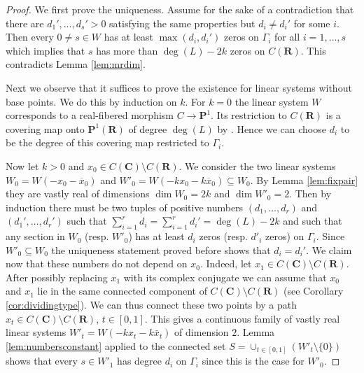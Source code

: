 \documentclass[12pt]{amsart}
\newcounter{conj}
\numberwithin{equation}{section}
\numberwithin{thmcounter}{section}
\theoremstyle{definition}
\theoremstyle{claim}
\newcommand{\nR}{\mathbf{R}}
\newcommand{\nC}{\mathbf{C}}
\newcommand{\nP}{\mathbf{P}}
\begin{document}
\begin{proof}
 We first prove the uniqueness. Assume for the sake of a contradiction that there are $d_1',\ldots,d_s'>0$ satisfying the same properties but $d_i\neq d_i'$ for some $i$. Then every $0\neq s\in W$ has at least $\max(d_i,d_i')$ zeros on $\Gamma_i$ for all $i=1,\ldots,s$ which implies that $s$ has more than $\deg(L)-2k$ zeros on $C(\nR)$. This contradicts Lemma \ref{lem:mrdim}.

\medskip

\noindent  Next we observe that it suffices to prove the existence for linear systems without base points. We do this by induction on $k$.
 For $k=0$ the linear system $W$ corresponds to a real-fibered morphism $C\to\nP^1$. Its restriction to $C(\nR)$ is a covering map onto $\nP^1(\nR)$ of degree $\deg(L)$ by \cite[Theorem 2.19]{kummershamovich}. Hence we can choose $d_i$ to be the degree of this covering map restricted to $\Gamma_i$.

\medskip

\noindent  Now let $k>0$ and $x_0\in C(\nC)\setminus C(\nR)$. We consider the two linear systems $W_0=W(-x_0-\overline{x}_0)$ and $W'_0=W(-kx_0-k\overline{x}_0)\subseteq W_0$.  
 By Lemma \ref{lem:fixpair} they are vastly real of dimensions $\dim W_0=2k$ and $\dim W'_0=2$. Then by induction there must be two tuples of positive numbers $(d_1,\ldots,d_r)$ and $(d_1',\ldots,d_r')$ such that $\sum_{i=1}^r d_i = \sum_{i=1}^{r} d_i' = \deg(L)-2k$ and such that any section in $W_0$ (resp. $W'_0$) has at least $d_i$ zeros (resp. $d'_i$ zeros) on $\Gamma_i$. Since $W'_0\subseteq W_0$ the uniqueness statement proved before shows that $d_i=d_i'$. We claim now that these numbers do not depend on $x_0$. Indeed, let $x_1\in C(\nC)\setminus C(\nR)$. After possibly replacing $x_1$ with its complex conjugate we can assume that $x_0$ and $x_1$ lie in the same connected component of $C(\nC)\setminus C(\nR)$ (see Corollary \ref{cor:dividingtype}). We can thus connect these two points by a path $x_t \in C(\nC)\setminus C(\nR)$, $t\in[0,1]$. This gives a continuous family of vastly real linear systems $W'_t=W(-kx_t-k\bar{x}_t)$ of dimension $2$. Lemma \ref{lem:numbersconstant} applied to the connected set $S=\cup_{t\in[0,1]}(W'_t\setminus\{0\})$ shows that every $s\in W'_1$ has degree $d_i$ on $\Gamma_i$ since this is the case for $W'_0$.

\medskip


\end{proof}
\end{document}
